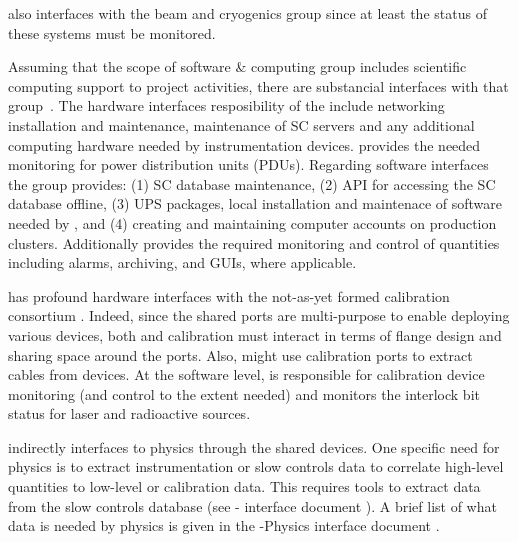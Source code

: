 
 also interfaces with the beam and cryogenics group since at least the status of these systems must be monitored.



Assuming that the scope of software \& computing  group includes scientific computing support to project activities, there are substancial interfaces with that group~\cite{bib:docdb7126}. 
The hardware interfaces resposibility of the  include networking installation and maintenance,
maintenance of SC servers  and any additional computing hardware needed by instrumentation devices.
 provides the needed monitoring for power distribution units (PDUs). Regarding software interfaces the  group  provides:
(1) SC database maintenance, (2) API for accessing the SC database offline,
(3) UPS packages, local installation and maintenace of software needed by , and (4)  creating and maintaining computer accounts on production clusters. 
Additionally   provides the required monitoring and control of  quantities including alarms, archiving, and GUIs, where applicable. 


 has profound hardware interfaces with the not-as-yet formed calibration consortium \cite{bib:docdb7072}. Indeed, since %
the shared ports are multi-purpose to enable deploying various devices,
both  and calibration must interact in terms of flange design and sharing space around the ports. Also,  might use calibration ports to extract cables from  devices. 
At the software level,  is responsible for calibration device monitoring (and control to the extent needed) and 
monitors the interlock bit status for laser and radioactive sources. 


 indirectly interfaces to physics through the shared devices. One specific need for physics is to extract 
instrumentation or slow controls data to correlate high-level quantities to low-level or calibration data.
This requires tools to extract data from the slow controls database (see - interface document \cite{bib:docdb7126}).
A brief list of what  data is needed by physics is given in the -Physics interface document \cite{bib:docdb7099}. 

